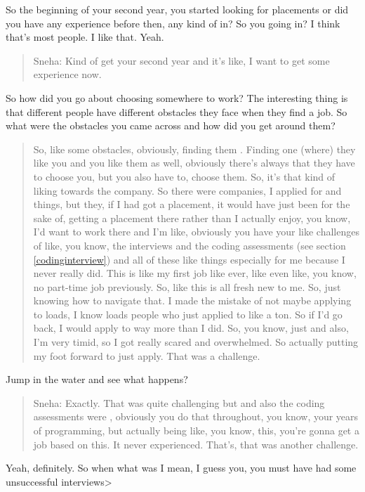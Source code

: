 \documentclass[
]{book}
\begin{document}
So the beginning of your second year, you started looking for placements or did you have any experience before then, any kind of in? So you going in? I think that's most people. I like that. Yeah.

\begin{quote}
Sneha: Kind of get your second year and it's like, I want to get some experience now.
\end{quote}

So how did you go about choosing somewhere to work? The interesting thing is that different people have different obstacles they face when they find a job. So what were the obstacles you came across and how did you get around them?

\begin{quote}
So, like some obstacles, obviously, finding them . Finding one (where) they like you and you like them as well, obviously there's always that they have to choose you, but you also have to, choose them. So, it's that kind of liking towards the company. So there were companies, I applied for and things, but they, if I had got a placement, it would have just been for the sake of, getting a placement there rather than I actually enjoy, you know, I'd want to work there and I'm like, obviously you have your like challenges of like, you know, the interviews and the coding assessments (see section \ref{codinginterview}) and all of these like things especially for me because I never really did. This is like my first job like ever, like even like, you know, no part-time job previously. So, like this is all fresh new to me. So, just knowing how to navigate that. I made the mistake of not maybe applying to loads, I know loads people who just applied to like a ton. So if I'd go back, I would apply to way more than I did. So, you know, just and also, I'm very timid, so I got really scared and overwhelmed. So actually putting my foot forward to just apply. That was a challenge.
\end{quote}

Jump in the water and see what happens?

\begin{quote}
Sneha: Exactly. That was quite challenging but and also the coding assessments were , obviously you do that throughout, you know, your years of programming, but actually being like, you know, this, you're gonna get a job based on this. It never experienced. That's, that was another challenge.
\end{quote}

Yeah, definitely. So when what was I mean, I guess you, you must have had some unsuccessful interviews\textgreater{}
\end{document}
